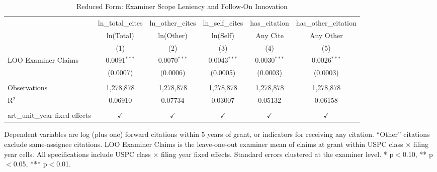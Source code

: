 
\begin{table}[htbp]
   \caption{\label{tab:reduced_form} Reduced Form: Examiner Scope Leniency and Follow-On Innovation}
   \bigskip
   \centering
   \begin{adjustbox}{max width=\textwidth}
   \begin{tabular}{lccccc}
      \toprule
                                      & ln\_total\_cites   & ln\_other\_cites   & ln\_self\_cites   & has\_citation  & has\_other\_citation\\    
                                      & ln(Total)          & ln(Other)          & ln(Self)          & Any Cite       & Any Other \\   
                                      & (1)                & (2)                & (3)               & (4)            & (5)\\  
      \midrule 
      LOO Examiner Claims             & 0.0091$^{***}$     & 0.0070$^{***}$     & 0.0043$^{***}$    & 0.0030$^{***}$ & 0.0026$^{***}$\\   
                                      & (0.0007)           & (0.0006)           & (0.0005)          & (0.0003)       & (0.0003)\\   
       \\
      Observations                    & 1,278,878          & 1,278,878          & 1,278,878         & 1,278,878      & 1,278,878\\  
      R$^2$                           & 0.06910            & 0.07734            & 0.03007           & 0.05132        & 0.06158\\  
       \\
      art\_unit\_year fixed effects   & $\checkmark$       & $\checkmark$       & $\checkmark$      & $\checkmark$   & $\checkmark$\\   
      \bottomrule
   \end{tabular}
   \end{adjustbox}
   
   \par \raggedright 
   Dependent variables are log (plus one) forward citations within 5 years of grant, or indicators for receiving any citation. ``Other'' citations exclude same-assignee citations. LOO Examiner Claims is the leave-one-out examiner mean of claims at grant within USPC class $\times$ filing year cells. All specifications include USPC class $\times$ filing year fixed effects. Standard errors clustered at the examiner level. * p$<$0.10, ** p$<$0.05, *** p$<$0.01.
\end{table}


